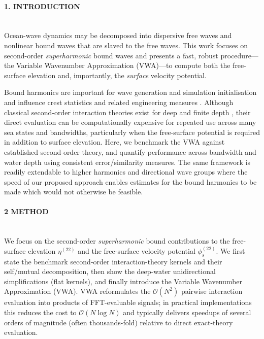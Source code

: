 \documentclass[11pt,letter]{article}
\begin{document}
\paragraph{1. INTRODUCTION}$\quad$\\
Ocean-wave dynamics may be decomposed into dispersive free waves and nonlinear bound waves that are slaved to the free waves. This work focuses on second-order \emph{superharmonic} bound waves and presents a fast, robust procedure---the Variable Wavenumber Approximation (VWA)---to compute both the free-surface elevation and, importantly, the \emph{surface} velocity potential.

Bound harmonics are important for wave generation and simulation initialisation \cite{madsen_third-order_2012} and influence crest statistics and related engineering measures \cite{forristall_wave_2000}. Although classical second-order interaction theories exist for deep and finite depth \cite{longuet-higgins_eulerian_1986,dalzell_note_1999}, their direct evaluation can be computationally expensive for repeated use across many sea states and bandwidths, particularly when the free-surface potential is required in addition to surface elevation. Here, we benchmark the VWA against established second-order theory, and quantify performance across bandwidth and water depth using consistent error/similarity measures. The same framework is readily extendable to higher harmonics and directional wave groups where the speed of our proposed approach enables estimates for the bound harmonics to be made which would not otherwise be feasible.

\paragraph{2 METHOD}$\quad$\\
We focus on the second-order \emph{superharmonic} bound contributions to the free-surface elevation $\eta^{(22)}$ and the free-surface velocity potential $\phi_s^{(22)}$.  We first state the benchmark second-order interaction-theory kernels and their self/mutual decomposition, then show the deep-water unidirectional simplifications (flat kernels), and finally introduce the Variable Wavenumber Approximation (VWA). VWA reformulates the $\mathcal{O}(N^2)$ pairwise interaction evaluation into products of FFT-evaluable  signals; in practical implementations this reduces the cost to $\mathcal{O}(N\log N)$ and typically delivers speedups of several orders of magnitude (often thousands-fold) relative to direct exact-theory evaluation.
\end{document}
